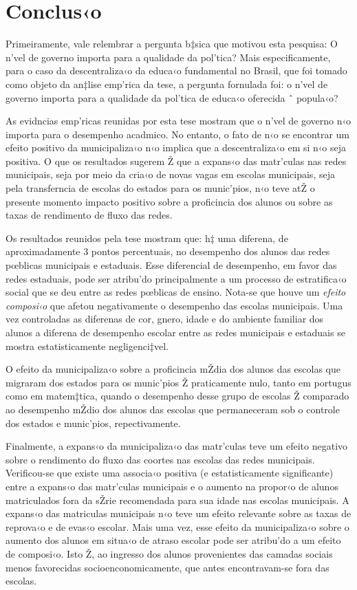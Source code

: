 \documentclass[a4paper, 12pt]{article}
\begin{document}
\pagebreak
\section{Conclus‹o}


Primeiramente, vale relembrar a pergunta b‡sica que motivou esta pesquisa: O n’vel de governo importa para a qualidade da pol’tica? Mais especificamente, para o caso da descentraliza‹o da educa‹o fundamental no Brasil, que foi tomado como objeto da an‡lise emp’rica da tese, a pergunta fornulada foi: o n’vel de governo importa para a qualidade da pol’tica de educa‹o oferecida ˆ popula‹o?

 As evidncias emp’ricas reunidas por esta tese mostram que o n’vel de governo n‹o importa para o desempenho acadmico. No entanto, o fato de n‹o se encontrar um efeito positivo da municipaliza‹o n‹o implica que a descentraliza‹o em si n‹o seja positiva. O que os resultados sugerem Ž que a expans‹o das matr’culas nas redes municipais, seja por meio da cria‹o de novas vagas em escolas municipais, seja pela transferncia de escolas do estados para os munic’pios, n‹o teve atŽ o presente momento impacto positivo sobre a proficincia dos alunos ou sobre as taxas de rendimento de fluxo das redes.

Os resultados reunidos pela tese mostram que: h‡ uma diferena, de aproximadamente 3 pontos percentuais, no desempenho dos alunos das redes pœblicas municipais e estaduais. Esse diferencial de desempenho, em favor das redes estaduais,  pode ser atribu’do principalmente a um processo de estratifica‹o social que se deu entre as redes pœblicas de ensino. Nota-se que houve um \emph{efeito composi‹o} que afetou negativamente o desempenho das escolas municipais. Uma vez controladas as diferenas de cor, gnero, idade e do ambiente familiar dos alunos a diferena de desempenho escolar entre as redes municipais e estaduais se mostra estatisticamente negligenci‡vel.

O efeito da municipaliza‹o sobre  a proficincia mŽdia dos alunos das escolas que migraram dos estados para os munic’pios Ž praticamente nulo, tanto em portugus como em matem‡tica, quando o desempenho desse grupo de escolas Ž comparado ao desempenho mŽdio dos alunos das escolas que permaneceram sob o controle dos estados e munic’pios, repectivamente.

Finalmente, a expans‹o da municipaliza‹o das matr’culas teve um efeito negativo sobre o rendimento do fluxo das coortes nas escolas das redes municipais. Verificou-se que existe uma associa‹o positiva (e estatisticamente significante) entre a expans‹o das matr’culas municipais e o aumento na propor‹o de alunos matriculados fora da sŽrie recomendada para sua idade nas escolas municipais. A expans‹o das matriculas municipais n‹o teve um efeito relevante sobre as taxas de reprova‹o e de evas‹o escolar. Mais uma vez, esse efeito da municipaliza‹o sobre o aumento dos alunos em situa‹o de atraso escolar pode ser atribu’do a um efeito de composi‹o. Isto Ž, ao ingresso dos alunos provenientes das camadas sociais menos favorecidas socioenconomicamente, que antes encontravam-se fora das escolas.  
  
\end{document}
